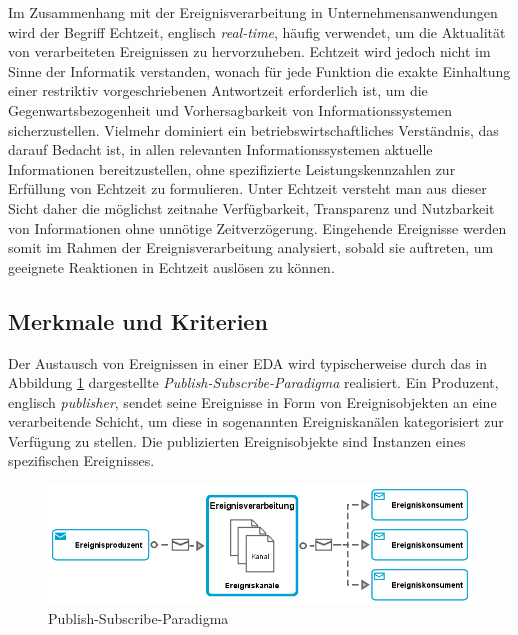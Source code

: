 Im Zusammenhang mit der Ereignisverarbeitung in Unternehmensanwendungen wird der Begriff Echtzeit, englisch \textit{real-time}, häufig verwendet, um die Aktualität von verarbeiteten Ereignissen zu hervorzuheben.
\cite{Bruns.2015}
Echtzeit wird jedoch nicht im Sinne der Informatik verstanden, wonach für jede Funktion die exakte Einhaltung einer restriktiv vorgeschriebenen Antwortzeit erforderlich ist, um die Gegenwartsbezogenheit und Vorhersagbarkeit von Informationssystemen sicherzustellen.
Vielmehr dominiert ein betriebswirtschaftliches Verständnis, das darauf Bedacht ist, in allen relevanten Informationssystemen aktuelle Informationen bereitzustellen, ohne spezifizierte Leistungskennzahlen zur Erfüllung von Echtzeit zu formulieren.
\cite{Worn.2005}
Unter Echtzeit versteht man aus dieser Sicht daher die möglichst zeitnahe Verfügbarkeit, Transparenz und Nutzbarkeit von Informationen ohne unnötige Zeitverzögerung.
Eingehende Ereignisse werden somit im Rahmen der Ereignisverarbeitung analysiert, sobald sie auftreten, um geeignete Reaktionen in Echtzeit auslösen zu können.
\cite{Grauer.2010}

\subsection{Merkmale und Kriterien}
Der Austausch von Ereignissen in einer \ac{EDA} wird typischerweise durch das in Abbildung \ref{fig:Publish-Subscribe-Paradigma} dargestellte \textit{Publish-Subscribe-Paradigma} realisiert. 
Ein Produzent, englisch \textit{publisher}, sendet seine Ereignisse in Form von Ereignisobjekten an eine verarbeitende Schicht, um diese in sogenannten Ereigniskanälen kategorisiert zur Verfügung zu stellen. Die publizierten Ereignisobjekte sind Instanzen eines spezifischen Ereignisses.
\cite{Metz.2014}

\begin{figure}[H]
	\centering 
    \includegraphics[width=\textwidth]{img/pubsub.png}	
    \caption[Publish-Subscribe-Paradigma]
    {Publish-Subscribe-Paradigma \protect\footnotemark}
    \label{fig:Publish-Subscribe-Paradigma}
\end{figure}

